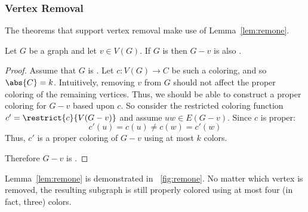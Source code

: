 \subsubsection{Vertex Removal}\label{sec:sub:sub:vertex}

The theorems that support vertex removal make use of Lemma~\ref{lem:remone}.

\begin{lemma}
  \label{lem:remone}
  Let \(G\) be a graph and let \(v\in V(G)\).  If \(G\) is  then \(G-v\) is also .
\end{lemma}

\begin{proof}
  Assume that \(G\) is .  Let \(c:V(G)\to C\) be such a coloring, and so \(\abs{C}=k\).  Intuitively,
  removing \(v\) from \(G\) should not affect the proper coloring of the remaining vertices.  Thus, we should be
  able to construct a proper coloring for \(G-v\) based upon \(c\).  So consider the restricted coloring function
  \(c'=\restrict{c}{V(G-v)}\) and assume \(uw\in E(G-v)\).  Since \(c\) is proper:
  \[c'(u)=c(u)\ne c(w)=c'(w)\]
  Thus, \(c'\) is a proper coloring of \(G-v\) using at most \(k\) colors.

  Therefore \(G-v\) is .
\end{proof}

Lemma~\ref{lem:remone} is demonstrated in \figurename~\ref{fig:remone}.  No matter which vertex is removed, the
resulting subgraph is still properly colored using at most four (in fact, three) colors.

